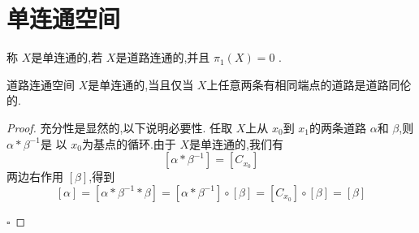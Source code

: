 \documentclass[../../几何与拓扑.tex]{subfiles}
\begin{document}
\section{单连通空间}

\begin{definition}
    称 \(  X  \)是单连通的,若 \(  X  \)是道路连通的,并且 \(  \pi _1 \left( X \right)= 0   \)  .
\end{definition}


\begin{proposition}
    道路连通空间 \(  X  \)是单连通的,当且仅当 \(  X  \)上任意两条有相同端点的道路是道路同伦的. 
\end{proposition}

\begin{proof}

    充分性是显然的,以下说明必要性.
    任取 \(  X  \)上从 \(  x_0  \)到 \(  x_1  \)的两条道路 \(  \alpha   \)和 \(  \beta   \),则 \(  \alpha *\beta ^{-1}   \)是 以 \(  x_0  \)为基点的循环.由于 \(  X  \)是单连通的,我们有 \[
    [\alpha *\beta ^{-1} ] =  [C_{x_0}]
    \]        两边右作用 \(  [\beta ]  \),得到 \[
    [\alpha ] =  [\alpha *\beta ^{-1} *\beta ] =  [\alpha *\beta ^{-1} ]\circ [\beta ] =  [C_{x_0}]\circ [\beta ] =  [\beta ]
   \] 

    \hfill $\square$
\end{proof}
\end{document}
